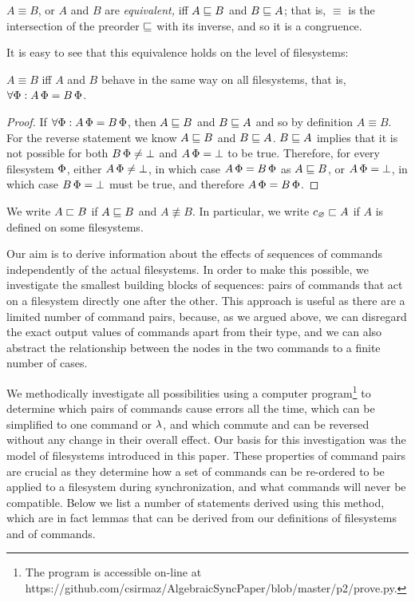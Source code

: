 \begin{mydef}[$\equiv$]
$A\equiv B$,
or $A$ and $B$ are \emph{equivalent,}
iff $A\sqsubseteq B$ and $B\sqsubseteq A$;
that is, $\equiv$ is the intersection of the preorder $\sqsubseteq$ with its inverse,
and so it is a congruence.
\end{mydef}

It is easy to see that this equivalence holds on the level of filesystems:

\begin{mylem}\label{equiv_on_fs}
$A\equiv B$
iff $A$ and $B$ behave in the same way on
all filesystems, that is, $\forall \Phi: A\,\Phi=B\,\Phi$.
\end{mylem}
\begin{proof}
If $\forall \Phi: A\,\Phi=B\,\Phi$, then $A\sqsubseteq B$ and $B\sqsubseteq A$ and so by definition $A\equiv B$.
For the reverse statement we know $A\sqsubseteq B$ and $B\sqsubseteq A$.
$B\sqsubseteq A$ implies that it is not possible for both $B\,\Phi\neq\bot$ and $A\,\Phi=\bot$ to be true.
Therefore, for every filesystem $\Phi$, either $A\,\Phi\neq\bot$, in which case $A\,\Phi=B\,\Phi$ as $A\sqsubseteq B$, or $A\,\Phi=\bot$,
in which case $B\,\Phi=\bot$ must be true, and therefore $A\,\Phi=B\,\Phi$.
\end{proof}

\begin{mydef}[$\strext$]
We write $A\sqsubset B$ if $A\sqsubseteq B$ and $A\nequiv B$.
In particular, we write $c_\varnothing\sqsubset{A}$ if $A$ is defined on some filesystems.
\end{mydef}


Our aim is to derive information about the effects of sequences
of commands independently of the actual filesystems.
In order to make this possible, we investigate the smallest building
blocks of sequences: pairs of commands that act on a filesystem directly one after the other.
This approach is useful as there are a limited number of command pairs,
because, as we argued above, we can disregard the exact output values of commands apart from their type,
and we can also abstract the relationship between the nodes in the two commands
to a finite number of cases.

We methodically investigate all possibilities using a computer 
program\footnote{The program is accessible on-line at \\
https://github.com/csirmaz/AlgebraicSyncPaper/blob/master/p2/prove.py.}
to determine
which pairs of commands cause errors all the time,
which can be simplified to one command or $\lambda$,
and which commute and can be reversed without any change in their overall effect.
Our basis for this investigation was the model of filesystems introduced in this paper.
These properties of command pairs are crucial as they determine
how a set of commands can be re-ordered to be applied to a filesystem
during synchronization, and what commands will never be compatible.
Below we list a number of statements derived using this method,
which are in fact lemmas that can be derived from our definitions of filesystems and of commands.

